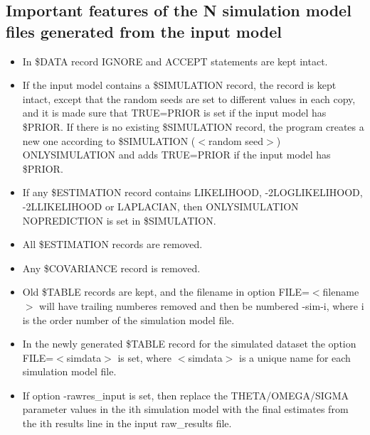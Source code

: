 \subsection{Important features of the N simulation model files generated from the input model}
\begin{itemize}
	\item In \$DATA record IGNORE and ACCEPT statements are kept intact.
	\item If the input model contains a \$SIMULATION record, the record is kept intact, except that the random seeds are set to different values in each copy, and it is made sure that TRUE=PRIOR is set if the input model has \$PRIOR. If there is no existing \$SIMULATION record, the program creates a new one according to \$SIMULATION ($<$random seed$>$) ONLYSIMULATION and adds TRUE=PRIOR if the input model has \$PRIOR.
	\item If any \$ESTIMATION record contains LIKELIHOOD, -2LOGLIKELIHOOD, -2LLIKELIHOOD or LAPLACIAN, then ONLYSIMULATION NOPREDICTION is set in \$SIMULATION.  
	\item All \$ESTIMATION records are removed. 
	\item Any \$COVARIANCE record is removed. 
	\item Old \$TABLE records are kept, and the filename in option FILE=$<$filename$>$ will have trailing numberes removed and then be numbered -sim-i, where i is the order number of the simulation model file. 
	\item In the newly generated \$TABLE record for the simulated dataset the option FILE=$<$simdata$>$ is set, where $<$simdata$>$ is a unique name for each simulation model file.
	\item If option -rawres\_input is set, then replace the THETA/OMEGA/SIGMA parameter values in the ith simulation model with the final estimates from the ith results line in the input raw\_results file.
\end{itemize}

